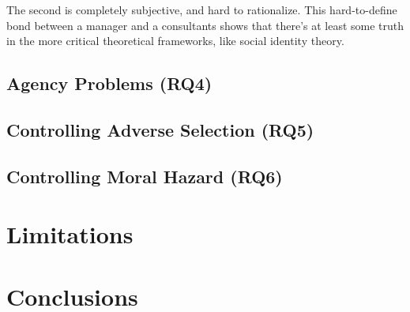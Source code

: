 \documentclass[12pt]{article}
\begin{document}
The second is completely subjective, and hard to rationalize. This
hard-to-define bond between a manager and a consultants shows that
there's at least some truth in the more critical theoretical frameworks,
like social identity theory.

\subsection{Agency Problems (RQ4)}\label{agency-problems-rq4}

\subsection{Controlling Adverse Selection
(RQ5)}\label{controlling-adverse-selection-rq5}

\subsection{Controlling Moral Hazard
(RQ6)}\label{controlling-moral-hazard-rq6}

\section{Limitations}\label{limitations}

\section{Conclusions}\label{conclusions}


\renewcommand\refname{References}

\end{document}
